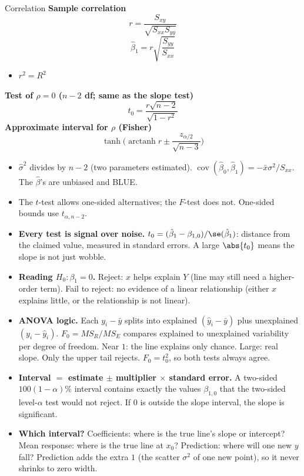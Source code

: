 \begin{formulabox}{Correlation}
\textbf{Sample correlation}
\[ r=\frac{S_{xy}}{\sqrt{S_{xx}S_{yy}}} \]
\[ \hat\beta_1=r\sqrt{\frac{S_{yy}}{S_{xx}}} \]
\begin{itemize}
  \item $r^2=R^2$
\end{itemize}
\textbf{Test of $\rho=0$ ($n-2$ df; same as the slope test)}
\[ t_0=\frac{r\sqrt{n-2}}{\sqrt{1-r^2}} \]
\textbf{Approximate interval for $\rho$ (Fisher)}
\[ \tanh\!\Big(\operatorname{arctanh}r\pm\frac{z_{\alpha/2}}{\sqrt{n-3}}\Big) \]
\end{formulabox}

\begin{notebox}
\begin{itemize}
  \item $\hat\sigma^2$ divides by $n-2$ (two parameters estimated). $\operatorname{cov}(\hat\beta_0,\hat\beta_1)=-\bar{x}\sigma^2/S_{xx}$. The $\hat\beta$'s are unbiased and BLUE.
  \item The $t$-test allows one-sided alternatives; the $F$-test does not. One-sided bounds use $t_{\alpha,n-2}$.
  \item \textbf{Every test is signal over noise.} $t_0=(\hat\beta_1-\beta_{1,0})/\se(\hat\beta_1)$: distance from the claimed value, measured in standard errors. A large $\abs{t_0}$ means the slope is not just wobble.
  \item \textbf{Reading $H_0:\beta_1=0$.} Reject: $x$ helps explain $Y$ (line may still need a higher-order term). Fail to reject: no evidence of a linear relationship (either $x$ explains little, or the relationship is not linear).
  \item \textbf{ANOVA logic.} Each $y_i-\bar{y}$ splits into explained $(\hat{y}_i-\bar{y})$ plus unexplained $(y_i-\hat{y}_i)$. $F_0=MS_R/MS_E$ compares explained to unexplained variability per degree of freedom. Near $1$: the line explains only chance. Large: real slope. Only the upper tail rejects. $F_0=t_0^2$, so both tests always agree.
  \item \textbf{Interval $=$ estimate $\pm$ multiplier $\times$ standard error.} A two-sided $100(1-\alpha)\%$ interval contains exactly the values $\beta_{1,0}$ that the two-sided level-$\alpha$ test would not reject. If $0$ is outside the slope interval, the slope is significant.
  \item \textbf{Which interval?} Coefficients: where is the true line's slope or intercept? Mean response: where is the true line at $x_0$? Prediction: where will one new $y$ fall? Prediction adds the extra $1$ (the scatter $\sigma^2$ of one new point), so it never shrinks to zero width.

\end{itemize}
\end{notebox}
